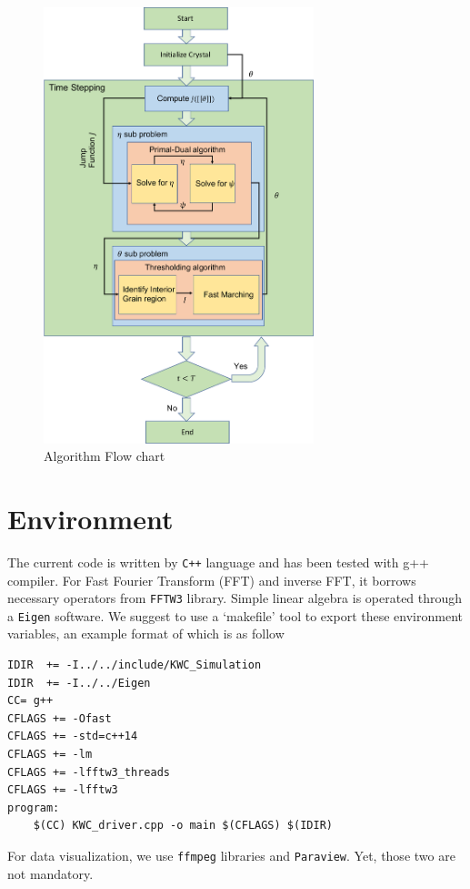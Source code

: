 \documentclass[11pt]{article}
\begin{document}
\begin{figure}
\begin{center}
\includegraphics[width=0.7\textwidth]{Figures/flowChart.pdf}
\end{center}
\caption{Algorithm Flow chart}
\label{Fig:flow_chart}
\end{figure}

\section{Environment}
The current code is written by \texttt{C++} language 
and has been tested with g++ compiler. 
For Fast Fourier Transform (FFT) and inverse FFT, 
it borrows necessary operators from  \texttt{FFTW3} library. 
Simple linear algebra is operated through a \texttt{Eigen} software. 
We suggest to use a `makefile' tool to export these environment variables, 
an example format of which is as follow
\begin{tcolorbox}[colback=white]
\begin{lstlisting}[basicstyle=\footnotesize]
IDIR  += -I../../include/KWC_Simulation
IDIR  += -I../../Eigen
CC= g++
CFLAGS += -Ofast
CFLAGS += -std=c++14
CFLAGS += -lm
CFLAGS += -lfftw3_threads
CFLAGS += -lfftw3
program: 
	$(CC) KWC_driver.cpp -o main $(CFLAGS) $(IDIR)
\end{lstlisting}
\end{tcolorbox}
For data visualization, we use \texttt{ffmpeg} libraries and \texttt{Paraview}. 
Yet, those two are not mandatory.  
\end{document}
